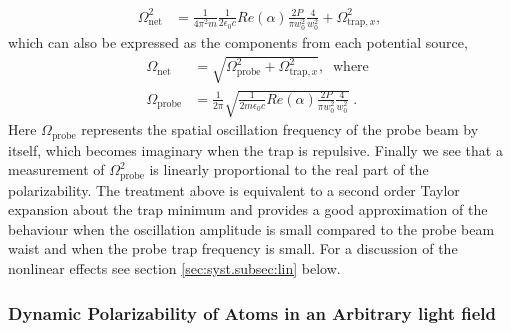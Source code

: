 	\begin{align}
	\Omega_{\text{net}}^2  & = \frac{1}{4\pi^2m} \frac{1}{2\epsilon_{0} c} Re(\alpha) \frac{2 P}{\pi w_0^2} \frac{4}{w_{0}^{2}} 
	+  \Omega_{\text{trap},x}^2,
	\end{align}
	which can also be expressed as the components from each potential source,
	\begin{align}
	\Omega_{\text{net}} & =\sqrt{\Omega_{\text{probe}}^{2}+\Omega_{\text{trap},x}^{2}}, \; \; \text{where }\\
	\Omega_{\text{probe}}& = \frac{1}{2\pi} \sqrt{\frac{1}{2m \epsilon_{0} c} Re(\alpha) \frac{2 P}{\pi w_0^2} \frac{4}{w_{0}^{2}}} \;.
	\end{align}
	Here \( \Omega_{\text{probe}} \) represents the spatial oscillation frequency of the probe beam by itself, which becomes imaginary when the trap is repulsive.
	Finally we see that a measurement of \( \Omega_{\text{probe}}^2 \) is linearly proportional to the real part of the polarizability. The treatment above is equivalent to a second order Taylor expansion about the trap minimum and provides a good approximation of the behaviour when the oscillation amplitude is small compared to the probe beam waist and when the probe trap frequency is small. For a discussion of the nonlinear effects see section \ref{sec:syst.subsec:lin} below.

\subsubsection{Dynamic Polarizability of Atoms in an Arbitrary light field}
	

